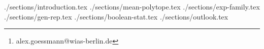 \documentclass[a4paper,11pt,english]{article}
\begin{document}
    \title{\mytitle{}}
    \author{Alex Goessmann\footnote{alex.goessmann@wias-berlin.de}}
    \author{Martin Eigel}

    \maketitle

    \begin{abstract}%
        
    \end{abstract}

    {./sections/introduction.tex}
    {./sections/mean-polytope.tex}
    {./sections/exp-family.tex}
    {./sections/gen-rep.tex}
    {./sections/boolean-stat.tex}
    {./sections/outlook.tex}


    \vskip 0.2in
    
    

    \appendix
\end{document}
